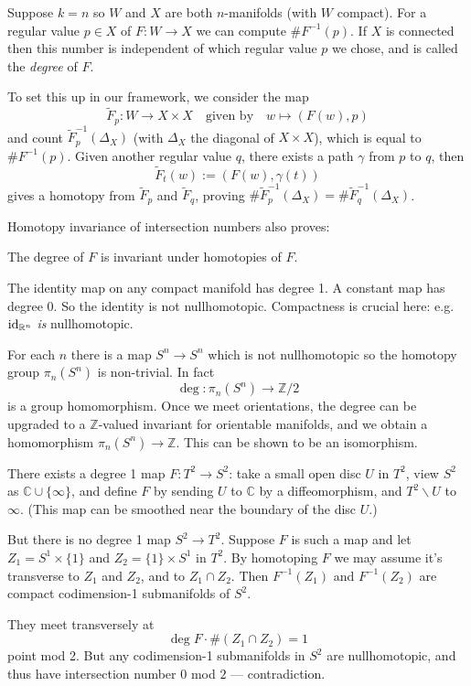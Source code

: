 \documentclass[a4paper,11pt]{article}
\begin{document}
	\begin{defi}
		Suppose $k = n$ so $W$ and $X$ are both $n$-manifolds (with $W$ compact). For a regular value $p \in X$ of $F : W \to X$ we can compute $\# F^{-1}(p)$. If $X$ is connected then this number is independent of which regular value $p$ we chose, and is called the \emph{degree} of $F$.
	\end{defi}

	To set this up in our framework, we consider the map
	\[
		\tilde F_p : W \to X \times X \quad \text{given by} \quad w \mapsto (F(w),p)
	\]
	and count $\tilde F_p^{-1}(\Delta_X)$ (with $\Delta_X$ the diagonal of $X \times X$), which is equal to $\# F^{-1}(p)$. Given another regular value $q$, there exists a path $\gamma$ from $p$ to $q$, then
	\[
		\tilde F_t(w):= (F(w),\gamma(t))
	\]
	gives a homotopy from $\tilde F_p$ and $\tilde F_q$, proving $\# \tilde F_p^{-1}(\Delta_X)=\# \tilde F_q^{-1}(\Delta_X)$.
	
	Homotopy invariance of intersection numbers also proves:
	\begin{thm}
		The degree of $F$ is invariant under homotopies of $F$.
	\end{thm}

	\begin{ex}
		The identity map on any compact manifold has degree 1. A constant map has degree 0. So the identity is not nullhomotopic. Compactness is crucial here: e.g.\ $\operatorname{id} _{\mathbb{R}^n}$ \emph{is} nullhomotopic.
	\end{ex}

	\begin{ex}
		For each $n$ there is a map $S^n \to S^n$ which is not nullhomotopic so the homotopy group $\pi_n (S^n)$ is non-trivial. In fact
		\[
			\deg : \pi_n (S^n) \to \mathbb{Z}/2
		\]
		is a group homomorphism. Once we meet orientations, the degree can be upgraded to a $\mathbb{Z}$-valued invariant for orientable manifolds, and we obtain a homomorphism $\pi_n(S^n)\to \mathbb{Z}$. This can be shown to be an isomorphism.
	\end{ex}

	\begin{ex}
		There exists a degree 1 map $F : T^2 \to S^2$: take a small open disc $U$ in $T^2$, view $S^2$ as $\mathbb{C}\cup \{\infty\}$, and define $F$ by sending $U$ to $\mathbb{C}$ by a diffeomorphism, and $T^2 \backslash U$ to $\infty$. (This map can be smoothed near the boundary of the disc $U$.)

		But there is no degree 1 map $S^2 \to T^2$. Suppose $F$ is such a map and let $Z_1 = S^1 \times \{1\}$ and $Z_2 = \{1\}\times S^1$ in $T^2$. By homotoping $F$ we may assume it's transverse to $Z_1$ and $Z_2$, and to $Z_1 \cap Z_2$. Then $F^{-1}(Z_1)$ and $F^{-1}(Z_2)$ are compact codimension-1 submanifolds of $S^2$.


		They meet transversely at
		\[
			\deg F \cdot \#(Z_1 \cap Z_2) = 1
		\]
		point mod 2. But any codimension-1 submanifolds in $S^2$ are nullhomotopic, and thus have intersection number $0$ mod $2$ --- contradiction.
	\end{ex}
\end{document}

